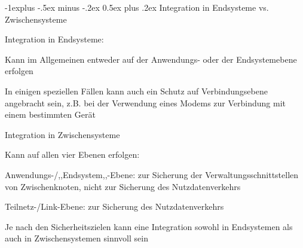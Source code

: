 \documentclass[a4paper]{article}
\makeatletter
\renewcommand{\subsection}{\@startsection{subsection}{2}{0mm}%
 {-1explus -.5ex minus -.2ex}%
 {0.5ex plus .2ex}%
 {\normalfont\normalsize\bfseries}}
\makeatother
\begin{document}
\begin{multicols}{3}
      \subsection{Integration in Endsysteme vs. Zwischensysteme}
      \begin{itemize*}
            \item Integration in Endsysteme:
            \begin{itemize*}
                  \item Kann im Allgemeinen entweder auf der Anwendungs- oder der Endsystemebene erfolgen
                  \item In einigen speziellen Fällen kann auch ein Schutz auf Verbindungsebene angebracht sein, z.B. bei der Verwendung eines Modems zur Verbindung mit einem bestimmten Gerät
            \end{itemize*}
            \item Integration in Zwischensysteme
            \begin{itemize*}
                  \item Kann auf allen vier Ebenen erfolgen:
                  \begin{itemize*}
                        \item Anwendungs-/,,Endsystem,,-Ebene: zur Sicherung der Verwaltungsschnittstellen von Zwischenknoten, nicht zur Sicherung des Nutzdatenverkehrs
                        \item Teilnetz-/Link-Ebene: zur Sicherung des Nutzdatenverkehrs
                  \end{itemize*}
            \end{itemize*}
            \item Je nach den Sicherheitszielen kann eine Integration sowohl in Endsystemen als auch in Zwischensystemen sinnvoll sein
      \end{itemize*}




\end{multicols}
\end{document}
